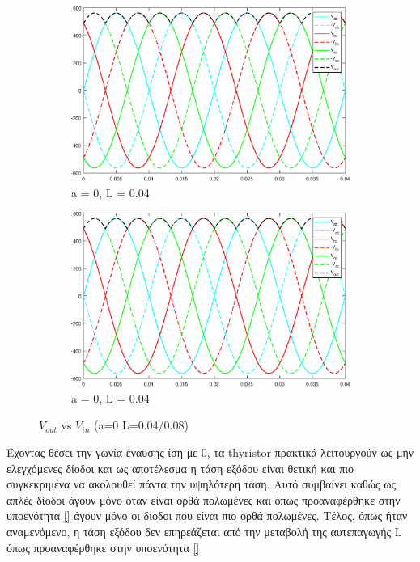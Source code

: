 \begin{figure}[h]
	\centering
	\begin{subfigure}{.5\textwidth}
		\centering
		\includegraphics[width = 0.9\linewidth]{Images/3_Vout_0_04}
		\caption{a = 0, L = 0.04}
		\label{fig:3_vout_0_04}
	\end{subfigure}%
	\begin{subfigure}{.5\textwidth}
		\centering
		\includegraphics[width = 0.9\linewidth]{Images/3_Vout_0_08}
		\caption{a = 0, L = 0.04}
		\label{fig:3_vout_0_08}
	\end{subfigure}
	\caption{$V_{out} $ vs $V_{in}$ (a=0 L=0.04/0.08)}
	\label{figs:3_vout_0}
\end{figure}

\noindent
Έχοντας θέσει την γωνία έναυσης ίση με 0, τα thyristor πρακτικά λειτουργούν ως μην ελεγχόμενες δίοδοι και ως αποτέλεσμα η τάση εξόδου είναι θετική και πιο συγκεκριμένα να ακολουθεί πάντα την υψηλότερη τάση. Αυτό συμβαίνει καθώς ως απλές δίοδοι άγουν μόνο όταν είναι ορθά πολωμένες και όπως προαναφέρθηκε στην υποενότητα \ref {} άγουν μόνο οι δίοδοι που είναι πιο ορθά πολωμένες. Τέλος, όπως ήταν αναμενόμενο, η τάση εξόδου δεν επηρεάζεται από την μεταβολή της αυτεπαγωγής L όπως προαναφέρθηκε στην υποενότητα \ref{}


